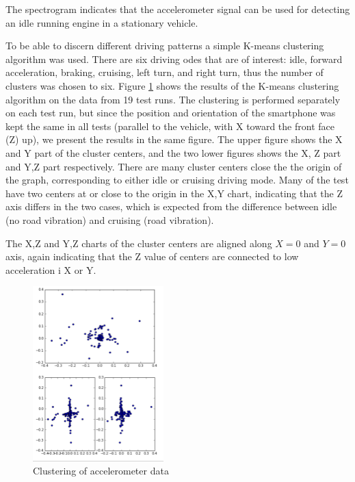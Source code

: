 The spectrogram indicates that the accelerometer signal can be used for detecting an idle running engine in a stationary vehicle.

To be able to discern different driving patterns a simple K-means clustering algorithm was used. There are six driving odes that are of interest: idle, forward acceleration, braking, cruising, left turn, and right turn, thus the number of clusters was chosen to six. Figure \ref{cluster} shows the results of the K-means clustering algorithm on the data from 19 test runs. The clustering is performed separately on each test run, but since the position and orientation of the smartphone was kept the same in all tests (parallel to the vehicle, with X toward the front face (Z) up), we present the results in the same figure. The upper figure shows the X and Y part of the cluster centers, and the two lower figures shows the X, Z part and Y,Z part respectively. There are many cluster centers close the the origin of the graph, corresponding to either idle or cruising driving mode. Many of the test have two centers at or close to the origin in the X,Y chart, indicating that the Z axis differs in the two cases, which is expected from the difference between idle (no road vibration) and cruising (road vibration).

The X,Z and Y,Z charts of the cluster centers are aligned along $X=0$ and $Y=0$ axis, again indicating that the Z value of centers are connected to low acceleration i X or Y.
\begin{figure}[h]
  	\centering
  	\includegraphics[width=0.45\textwidth]
  	{cluster_acc}
  \caption{Clustering of accelerometer data}
  \label{cluster}
\end{figure}

